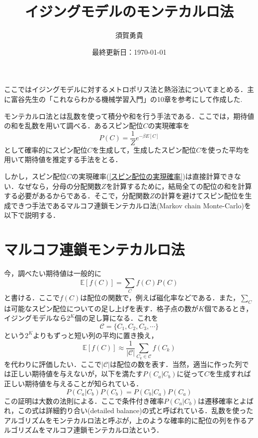 \documentclass[a4paper,11pt]{jsarticle}
\begin{document}
\title{イジングモデルのモンテカルロ法}
\author{須賀勇貴}
\date{最終更新日：\today}
\maketitle
ここではイジングモデルに対するメトロポリス法と熱浴法についてまとめる．主に富谷先生の「これならわかる機械学習入門」の10章を参考にして作成した.\par
\vspace{1cm}

モンテカルロ法とは乱数を使って積分や和を行う手法である．ここでは，期待値の和を乱数を用いて調べる．あるスピン配位$C$の実現確率を
\begin{equation}
  \label{スピン配位の実現確率}
  P(C)=\frac{1}{Z}e^{-\beta E[C]}
\end{equation}
として確率的にスピン配位$C$を生成して，生成したスピン配位$C$を使った平均を用いて期待値を推定する手法をとる．\par
しかし，スピン配位$C$の実現確率(\ref{スピン配位の実現確率})は直接計算できない．なぜなら，分母の分配関数$Z$を計算するために，結局全ての配位の和を計算する必要があるからである．そこで，分配関数$Z$の計算を避けてスピン配位を生成できつ手法であるマルコフ連鎖モンテカルロ法(Markov chain Monte-Carlo)を以下で説明する．

\section{マルコフ連鎖モンテカルロ法}
今，調べたい期待値は一般的に
\begin{equation}
  \mathbb{E}[f(C)] = \sum_{C} f(C)P(C)
\end{equation}
と書ける．ここで$f(C)$は配位の関数で，例えば磁化率などである．また，$\sum_{C}$は可能なスピン配位についての足し上げを表す．格子点の数が$K$個であるとき，イジングモデルなら$2^K$個の足し算になる．これを
\begin{equation}
  \mathcal{C} = \{ C_1, C_2, C_3, \cdots \}
\end{equation}
という$2^K$よりもずっと短い列の平均に置き換え，
\begin{equation}
  \mathbb{E}[f(C)] \approx \frac{1}{|\mathcal{C|}}\sum_{C_k \in \mathcal{C}}f(C_k)
\end{equation}
を代わりに評価したい．ここで$|\mathcal{C}|$は配位の数を表す．当然，適当に作った列では正しい期待値を与えないが，以下を満たす$P(C_a|C_b)$に従って$C$を生成すれば正しい期待値を与えることが知られている．
\begin{equation}
  P(C_a|C_b)P(C_b) = P(C_b|C_a)P(C_a)
\end{equation}
この証明は大数の法則による．ここで条件付き確率$P(C_a|C_b)$は遷移確率とよばれ，この式は詳細釣り合い(detailed balance)の式と呼ばれている．乱数を使ったアルゴリズムをモンテカルロ法と呼ぶが，上のような確率的に配位の列を作るアルゴリズムをマルコフ連鎖モンテカルロ法という．\par
\end{document}
